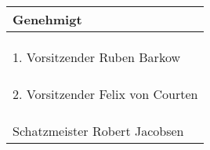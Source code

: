 \documentclass[12pt,a4paper]{article}
\newcommand{\VorstandEins}{Ruben Barkow}
\newcommand{\VorstandZwei}{Felix von Courten}
\newcommand{\Schatzmeister}{Robert Jacobsen}
\begin{document}
\bigskip
\begin{center}

\begin{tabular}{|p{15cm}|}
\hline 
Genehmigt \\ 
\hline 
 \\
 \\
 \\
\hline 
1. Vorsitzender \VorstandEins \\ 
\hline 
 \\
 \\
 \\
\hline 
2. Vorsitzender \VorstandZwei \\ 
\hline
 \\
 \\
 \\
\hline
Schatzmeister \Schatzmeister \\
\hline
\end{tabular} 

\end{center}
\end{document}
